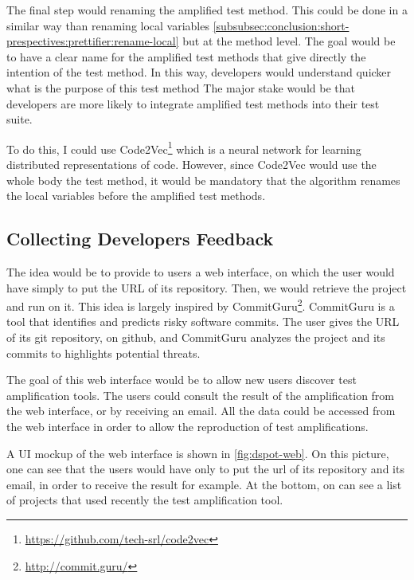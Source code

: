 The final step would renaming the amplified test method.
This could be done in a similar way than renaming local variables \autoref{subsubsec:conclusion:short-prespectives:prettifier:rename-local} but at the method level.
The goal would be to have a clear name for the amplified test methods that give directly the intention of the test method.
In this way, developers would understand quicker what is the purpose of this test method
The major stake would be that developers are more likely to integrate amplified test methods into their test suite.

To do this, I could use Code2Vec\footnote{\url{https://github.com/tech-srl/code2vec}}\cite{DBLP:journals/corr/abs-1803-09473} which is a neural network for learning distributed representations of code.
However, since Code2Vec would use the whole body the test method, it would be mandatory that the algorithm renames the local variables before the amplified test methods.

\subsection{Collecting  Developers Feedback}
\label{subsec:conclusion:short-prespectives:web-interface}
The idea would be to provide to users a web interface, on which the user would have simply to put the URL of its \gh repository.
Then, we would retrieve the project and run \dspot on it.
This idea is largely inspired by CommitGuru\footnote{\url{http://commit.guru/}}\cite{Rosen:2015:FSE}.
CommitGuru is a tool that identifies and predicts risky software commits.
The user gives the URL of its git repository, \eg on github, and CommitGuru analyzes the project and its commits to highlights potential threats.

The goal of this web interface would be to allow new users discover test amplification tools.
The users could consult the result of the amplification from the web interface, or by receiving an email.
All the data could be accessed from the web interface in order to allow the reproduction of test amplifications.

A UI mockup of the web interface is shown in \autoref{fig:dspot-web}.
On this picture, one can see that the users would have only to put the url of its repository and its email, in order to receive the result for example.
At the bottom, on can see a list of projects that used recently the test amplification tool.

